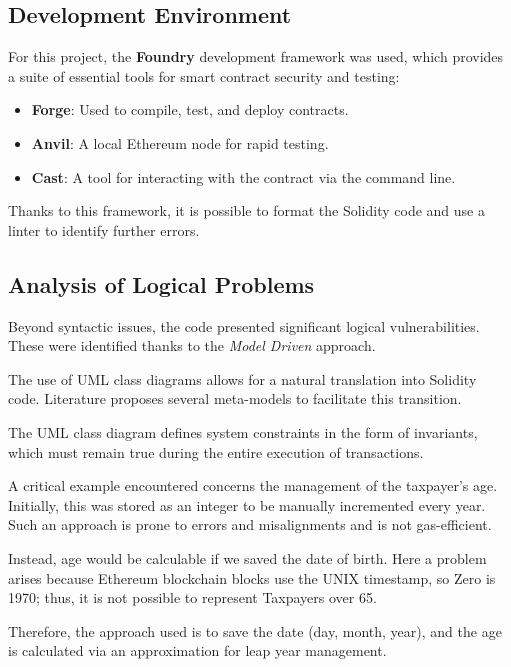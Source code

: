 \documentclass[conference]{IEEEtran}
\begin{document}
\subsection{Development Environment}

For this project, the \textbf{Foundry} development framework was used, which provides a suite of essential tools for smart contract security and testing:

\begin{itemize}
	\item \textbf{Forge}: Used to compile, test, and deploy contracts.
	\item \textbf{Anvil}: A local Ethereum node for rapid testing.
	\item \textbf{Cast}: A tool for interacting with the contract via the command line.
\end{itemize}

Thanks to this framework, it is possible to format the Solidity code and use a linter to identify further errors.

\subsection{Analysis of Logical Problems}

Beyond syntactic issues, the code presented significant logical vulnerabilities. These were identified thanks to the \textit{Model Driven} approach.

The use of UML class diagrams allows for a natural translation into Solidity code. Literature proposes several meta-models to facilitate this transition.

The UML class diagram defines system constraints in the form of invariants, which must remain true during the entire execution of transactions.

A critical example encountered concerns the management of the taxpayer's age. Initially, this was stored as an integer to be manually incremented every year.
Such an approach is prone to errors and misalignments and is not gas-efficient.

Instead, age would be calculable if we saved the date of birth. Here a problem arises because Ethereum blockchain blocks use the UNIX timestamp, so Zero is 1970; thus, it is not possible to represent Taxpayers over 65.

Therefore, the approach used is to save the date (day, month, year), and the age is calculated via an approximation for leap year management.
\end{document}
